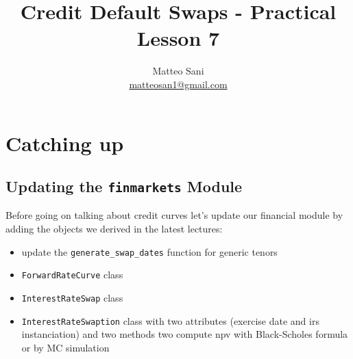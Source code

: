 \documentclass[11pt]{article}
\title{Credit Default Swaps - Practical Lesson 7}
\author {Matteo Sani\\ \href{mailto:matteosan1@gmail.com}{matteosan1@gmail.com}}
\providecommand{\tightlist}{%
      \setlength{\itemsep}{0pt}\setlength{\parskip}{0pt}}
\begin{document}
    
    
    \maketitle
    
    

    
    \hypertarget{credit-default-swaps---practical-lesson-7}{%
\section{Catching up}\label{credit-default-swaps---practical-lesson-7}}

\hypertarget{updating-the-finmarkets-module}{%
\subsection{\texorpdfstring{Updating the \texttt{finmarkets}
Module}{Updating the finmarkets Module}}\label{updating-the-finmarkets-module}}

Before going on talking about credit curves let's update our financial
module by adding the objects we derived in the latest lectures:

\begin{itemize}
\tightlist
\item
  update the \texttt{generate\_swap\_dates} function for generic tenors
\item
  \texttt{ForwardRateCurve} class
\item
  \texttt{InterestRateSwap} class
\item
  \texttt{InterestRateSwaption} class with two attributes (exercise date
  and irs instanciation) and two methods two compute npv with
  Black-Scholes formula or by MC simulation
\end{itemize}
\end{document}
